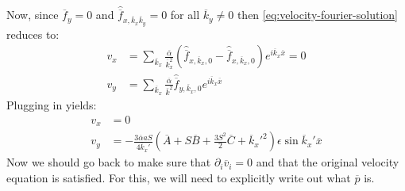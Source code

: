 \documentclass[reqno]{article}
\begin{document}
	Now, since $\overline{f}_y = 0$ and $\hat{\overline{f}}_{x, \overline{k}_x \overline{k}_y} = 0$ for all $\overline{k}_y \neq 0$ then \eqref{eq:velocity-fourier-solution} reduces to:
	\begin{equation}
	\begin{split}
	v_x 
	&= \sum_{\overline{k}_x}
	\frac{\overline{\alpha}}{\overline{k}_x^2}
	\left(
	\hat{\overline{f}}_{x, \overline{k}_x, 0}
	- \hat{\overline{f}}_{x, \overline{k}_x, 0}
	\right)
	e^{i \overline{k}_x \overline{x}}
	= 0 \\
	v_y
	&= \sum_{\overline{k}_x}
	\frac{\overline{\alpha}}{\overline{k}^2}
	\hat{\overline{f}}_{y, \overline{k}_x, 0} 
	e^{i \overline{k}_x \overline{x}}
	\end{split}
	\end{equation}
	Plugging in yields:
	\begin{equation}
	\begin{split}
	v_x
	&= 0 \\
	v_y
	&= -\frac{3 \overline{\alpha} a S}{4 \overline{k}_x'}
	\left(
	\overline{A}
	+ S \overline{B}
	+ \frac{3 S^2}{2} \overline{C}
	+ \overline{k}_x'^2
	\right)
	\epsilon \sin \overline{k}_x' \overline{x}
	\end{split}
	\end{equation}
	Now we should go back to make sure that $\partial_i \overline{v}_i = 0$ and that the original velocity equation is satisfied. For this, we will need to explicitly write out what $\overline{p}$ is.
	
\end{document}
